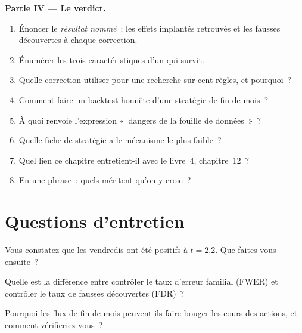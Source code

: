\begin{problem}
\medskip\noindent\textbf{Partie IV --- Le verdict.}
\begin{enumerate}[resume]
\item Énoncer le \emph{résultat nommé}~: les effets implantés retrouvés et les fausses découvertes à chaque correction.
\item Énumérer les trois caractéristiques d'un  qui survit.
\item Quelle correction utiliser pour une recherche sur cent règles, et pourquoi~?
\item Comment faire un backtest honnête d'une stratégie de fin de mois~?
\item À quoi renvoie l'expression «~dangers de la fouille de données~»~?
\item Quelle fiche de stratégie a le mécanisme le plus faible~?
\item Quel lien ce chapitre entretient-il avec le livre~4, chapitre~12~?
\item En une phrase~: quels  méritent qu'on y croie~?
\end{enumerate}
\end{problem}

\section{Questions d'entretien}

\begin{interviewq}\label{iq:s1:seasonality-and-calendar-effects:1}
Vous constatez que les vendredis ont été positifs à $t = 2.2$. Que faites-vous ensuite~?
\end{interviewq}

\begin{interviewq}\label{iq:s1:seasonality-and-calendar-effects:2}
Quelle est la différence entre contrôler le taux d'erreur familial (FWER) et contrôler le taux de fausses découvertes (FDR)~?
\end{interviewq}

\begin{interviewq}\label{iq:s1:seasonality-and-calendar-effects:3}
Pourquoi les flux de fin de mois peuvent-ils faire bouger les cours des actions, et comment vérifieriez-vous~?
\end{interviewq}

